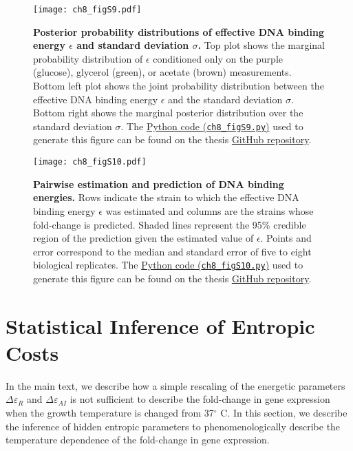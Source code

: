 \documentclass[12pt]{caltech_thesis}
\begin{document}
\hypertarget{fig:carbon_cornerplot}{%
\begin{figure}
\centering
\texttt{[image: ch8\_figS9.pdf]}
\caption[{Posterior probability distributions of effective DNA binding
and standard deviation for different carbon sources.}]{\textbf{Posterior
probability distributions of effective DNA binding energy \(\epsilon\)
and standard deviation \(\sigma\).} Top plot shows the marginal
probability distribution of \(\epsilon\) conditioned only on the purple
(glucose), glycerol (green), or acetate (brown) measurements. Bottom
left plot shows the joint probability distribution between the effective
DNA binding energy \(\epsilon\) and the standard deviation \(\sigma\).
Bottom right shows the marginal posterior distribution over the standard
deviation \(\sigma\). The
\href{https://github.com/gchure/phd/blob/master/src/chapter_08/code/ch8_figS9.py}{Python
code (\texttt{ch8\_figS9.py})} used to generate this figure can be found
on the thesis \href{https://github.com/gchure/phd}{GitHub repository}.}
\label{fig:carbon_cornerplot}
\end{figure}
}

\hypertarget{fig:pairwise_carbon}{%
\begin{figure}
\centering
\texttt{[image: ch8\_figS10.pdf]}
\caption[{Pairwise estimation and prediction of DNA binding energies
estimated from different carbon sources.}]{\textbf{Pairwise estimation
and prediction of DNA binding energies.} Rows indicate the strain to
which the effective DNA binding energy \(\epsilon\) was estimated and
columns are the strains whose fold-change is predicted. Shaded lines
represent the 95\% credible region of the prediction given the estimated
value of \(\epsilon\). Points and error correspond to the median and
standard error of five to eight biological replicates. The
\href{https://github.com/gchure/phd/blob/master/src/chapter_08/code/ch8_figS10.py}{Python
code (\texttt{ch8\_figS10.py})} used to generate this figure can be
found on the thesis \href{https://github.com/gchure/phd}{GitHub
repository}.}
\label{fig:pairwise_carbon}
\end{figure}
}

\hypertarget{statistical-inference-of-entropic-costs}{%
\section{Statistical Inference of Entropic
Costs}\label{statistical-inference-of-entropic-costs}}

In the main text, we describe how a simple rescaling of the energetic
parameters \(\Delta\varepsilon_R\) and \(\Delta\varepsilon_{AI}\) is not
sufficient to describe the fold-change in gene expression when the
growth temperature is changed from 37\(^\circ\) C. In this section, we
describe the inference of hidden entropic parameters to
phenomenologically describe the temperature dependence of the
fold-change in gene expression.
\end{document}
